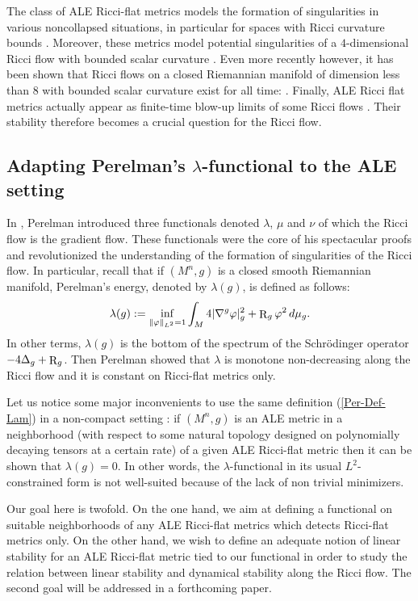 \documentclass[a4paper,11pt,reqno]{amsart}
\def\R{\mathop{\rm R}\nolimits}
\numberwithin{equation}{section}
\begin{document}
	The class of ALE Ricci-flat metrics models the formation of singularities in various noncollapsed situations, in particular for spaces with Ricci curvature bounds \cite{and,Ban-Kas-Nak}. Moreover, these metrics model potential singularities of a $4$-dimensional Ricci flow with bounded scalar curvature \cite{bz}. Even more recently however, it has been shown that Ricci flows on a closed Riemannian manifold of dimension less than $8$ with bounded scalar curvature exist for all time: \cite{Buz-DiM}. Finally, ALE Ricci flat metrics actually appear as finite-time blow-up limits of some Ricci flows \cite{app-EH}. Their stability therefore becomes a crucial question for the Ricci flow.
	\subsection*{Adapting Perelman's $\lambda$-functional to the ALE setting}
	In \cite{Per-Ent}, Perelman introduced three functionals denoted $\lambda$, $\mu$ and $\nu$ of which the Ricci flow is the gradient flow. These functionals were the core of his spectacular proofs and revolutionized the understanding of the formation of singularities of the Ricci flow. 
		In particular, recall that if $(M^n,g)$ is a closed smooth Riemannian manifold, Perelman's energy, denoted by $\lambda(g)$, is defined as follows:
\begin{equation}
\lambda(g):=\inf_{\|\varphi\|_{L^2}=1}\int_M4|\nabla^g\varphi|^2_g+\R_g\varphi^2\,d\mu_g.\label{Per-Def-Lam}
\end{equation}
In other terms, $\lambda(g)$ is the bottom of the spectrum of the Schr\"odinger operator $-4\Delta_g+\R_g$. Then Perelman showed that $\lambda$ is monotone non-decreasing along the Ricci flow and it is constant on Ricci-flat metrics only. 

Let us notice some major inconvenients to use the same definition (\ref{Per-Def-Lam}) in a non-compact setting : if $(M^n,g)$ is an ALE metric in a neighborhood (with respect to some natural topology designed on polynomially decaying tensors at a certain rate) of a given ALE Ricci-flat metric then it can be shown that $\lambda(g)=0$. In other words, the $\lambda$-functional in its usual $L^2$-constrained form is not well-suited because of the lack of non trivial minimizers. 
	
	Our goal here is twofold. On the one hand, we aim at defining a functional on suitable neighborhoods of any ALE Ricci-flat metrics which detects Ricci-flat metrics only. On the other hand, we wish to define an adequate notion of linear stability for an ALE Ricci-flat metric tied to our functional in order to study the relation between linear stability and dynamical stability along the Ricci flow. The second goal will be addressed in a forthcoming paper.
	
\end{document}
